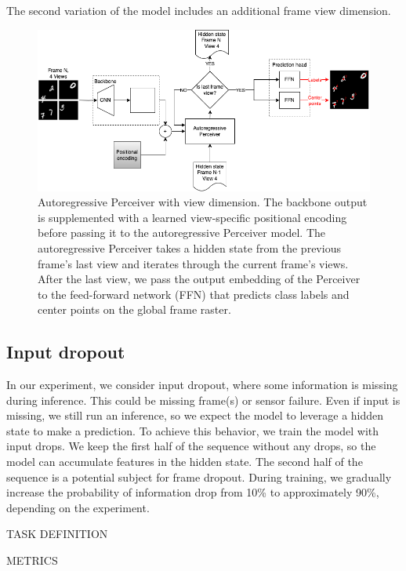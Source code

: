 The second variation of the model includes an additional frame view dimension.

\begin{figure}
    \centering
    \includegraphics[width=\textwidth]{figures/figure_methods_model_ar_perceiver_views.png}
    \caption{Autoregressive Perceiver with view dimension. The backbone output is supplemented with a learned view-specific positional encoding before passing it to the autoregressive Perceiver model. The autoregressive Perceiver takes a hidden state from the previous frame's last view and iterates through the current frame's views. After the last view, we pass the output embedding of the Perceiver to the feed-forward network (FFN) that predicts class labels and center points on the global frame raster.}
    \label{fig:figure_methods_model_ar_perceiver_views}
\end{figure}



\subsection{Input dropout}

In our experiment, we consider input dropout, where some information is missing during inference. This could be missing frame(s) or sensor failure. Even if input is missing, we still run an inference, so we expect the model to leverage a hidden state to make a prediction.
To achieve this behavior, we train the model with input drops. We keep the first half of the sequence without any drops, so the model can accumulate features in the hidden state. The second half of the sequence is a potential subject for frame dropout. During training, we gradually increase the probability of information drop from 10\% to approximately 90\%, depending on the experiment.


TASK DEFINITION

METRICS